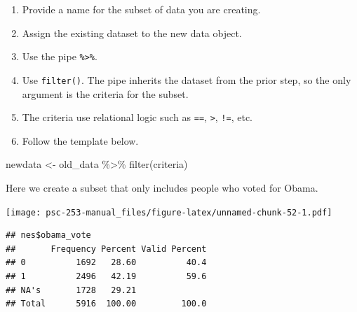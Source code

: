 \documentclass[
]{book}
\newenvironment{Shaded}{\begin{snugshade}}{\end{snugshade}}
\newcommand{\CommentTok}[1]{\textcolor[rgb]{0.56,0.35,0.01}{\textit{#1}}}
\newcommand{\DecValTok}[1]{\textcolor[rgb]{0.00,0.00,0.81}{#1}}
\newcommand{\FunctionTok}[1]{\textcolor[rgb]{0.00,0.00,0.00}{#1}}
\newcommand{\NormalTok}[1]{#1}
\newcommand{\OtherTok}[1]{\textcolor[rgb]{0.56,0.35,0.01}{#1}}
\newcommand{\SpecialCharTok}[1]{\textcolor[rgb]{0.00,0.00,0.00}{#1}}
\providecommand{\tightlist}{%
  \setlength{\itemsep}{0pt}\setlength{\parskip}{0pt}}
\begin{document}
\begin{enumerate}
\def\labelenumi{\arabic{enumi}.}
\tightlist
\item
  Provide a name for the subset of data you are creating.
\item
  Assign the existing dataset to the new data object.
\item
  Use the pipe \texttt{\%\textgreater{}\%}.
\item
  Use \texttt{filter()}. The pipe inherits the dataset from the prior step, so the only argument is the criteria for the subset.
\item
  The criteria use relational logic such as \texttt{==}, \texttt{\textgreater{}}, \texttt{!=}, etc.
\item
  Follow the template below.
\end{enumerate}

\begin{Shaded}
\begin{Highlighting}[]
\NormalTok{newdata }\OtherTok{\textless{}{-}}\NormalTok{ old\_data }\SpecialCharTok{\%\textgreater{}\%}
  \FunctionTok{filter}\NormalTok{(criteria)}
\end{Highlighting}
\end{Shaded}

Here we create a subset that only includes people who voted for Obama.

\begin{Shaded}
\end{Shaded}

\texttt{[image: psc-253-manual\_files/figure-latex/unnamed-chunk-52-1.pdf]}

\begin{verbatim}
## nes$obama_vote 
##       Frequency Percent Valid Percent
## 0          1692   28.60          40.4
## 1          2496   42.19          59.6
## NA's       1728   29.21              
## Total      5916  100.00         100.0
\end{verbatim}

\begin{Shaded}
\end{Shaded}
\end{document}
